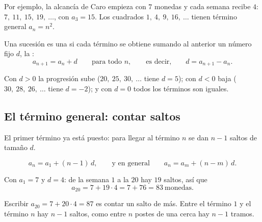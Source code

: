 \documentclass[11pt,a4paper]{article}
\begin{document}
Por ejemplo, la alcancía de Caro empieza con $7$ monedas y cada semana recibe $4$: $7,\ 11,\ 15,\ 19,\ \dots$, con
$a_3=15$. Los cuadrados $1,\ 4,\ 9,\ 16,\ \dots$ tienen término general $a_n=n^2$.

\begin{definicion}
Una sucesión es una  si cada término se obtiene sumando al anterior un número fijo $d$,
la :
\[ a_{n+1}=a_n+d\qquad\text{para todo } n,\qquad\text{es decir,}\qquad d=a_{n+1}-a_n . \]
\end{definicion}
Con $d>0$ la progresión sube ($20,\ 25,\ 30,\ \dots$ tiene $d=5$); con $d<0$ baja ($30,\ 28,\ 26,\ \dots$ tiene $d=-2$);
y con $d=0$ todos los términos son iguales.

\subsection{El término general: contar saltos}
\begin{figura}
\end{figura}

El primer término ya está puesto: para llegar al término $n$ se dan $n-1$ saltos de tamaño $d$.
\begin{propiedad}
\[ a_n=a_1+(n-1)\,d,\qquad\text{y en general}\qquad a_n=a_m+(n-m)\,d . \]
\end{propiedad}

\begin{ejemplo}
Con $a_1=7$ y $d=4$: de la semana $1$ a la $20$ hay $19$ saltos, así que
\[ a_{20}=7+19\cdot 4=7+76=83\ \text{monedas}. \]
\end{ejemplo}
\begin{ojo}
Escribir $a_{20}=7+20\cdot 4=87$ es contar un salto de más. Entre el término $1$ y el término $n$ hay $n-1$ saltos,
como entre $n$ postes de una cerca hay $n-1$ tramos.
\end{ojo}
\end{document}
